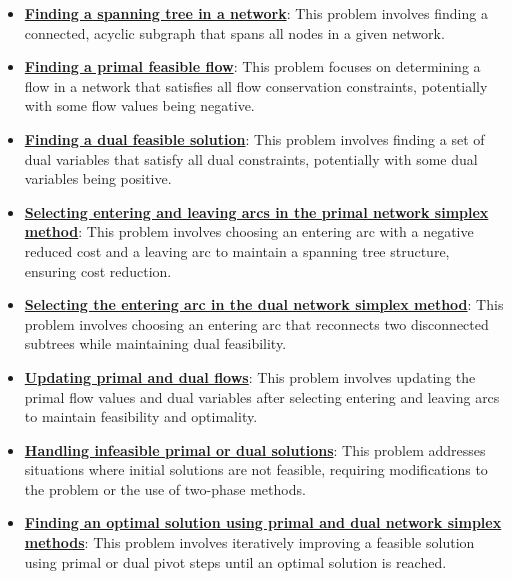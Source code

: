 \documentclass{article}%
\begin{document}
\begin{itemize}[leftmargin=*]%
\item \href{https://www.math.purdue.edu/~yipn/421//2024-11-07-NetSimplex.pdf#page=1}{\textbf{Finding a spanning tree in a network}}: This problem involves finding a connected, acyclic subgraph that spans all nodes in a given network.%
\item \href{https://www.math.purdue.edu/~yipn/421//2024-11-07-NetSimplex.pdf#page=2}{\textbf{Finding a primal feasible flow}}: This problem focuses on determining a flow in a network that satisfies all flow conservation constraints, potentially with some flow values being negative.%
\item \href{https://www.math.purdue.edu/~yipn/421//2024-11-07-NetSimplex.pdf#page=3}{\textbf{Finding a dual feasible solution}}: This problem involves finding a set of dual variables that satisfy all dual constraints, potentially with some dual variables being positive.%
\item \href{https://www.math.purdue.edu/~yipn/421//2024-11-07-NetSimplex.pdf#page=6}{\textbf{Selecting entering and leaving arcs in the primal network simplex method}}: This problem involves choosing an entering arc with a negative reduced cost and a leaving arc to maintain a spanning tree structure, ensuring cost reduction.%
\item \href{https://www.math.purdue.edu/~yipn/421//2024-11-07-NetSimplex.pdf#page=35}{\textbf{Selecting the entering arc in the dual network simplex method}}: This problem involves choosing an entering arc that reconnects two disconnected subtrees while maintaining dual feasibility.%
\item \href{https://www.math.purdue.edu/~yipn/421//2024-11-07-NetSimplex.pdf#page=6}{\textbf{Updating primal and dual flows}}: This problem involves updating the primal flow values and dual variables after selecting entering and leaving arcs to maintain feasibility and optimality.%
\item \href{https://www.math.purdue.edu/~yipn/421//2024-11-07-NetSimplex.pdf#page=2}{\textbf{Handling infeasible primal or dual solutions}}: This problem addresses situations where initial solutions are not feasible, requiring modifications to the problem or the use of two-phase methods.%
\item \href{https://www.math.purdue.edu/~yipn/421//2024-11-07-NetSimplex.pdf#page=5}{\textbf{Finding an optimal solution using primal and dual network simplex methods}}: This problem involves iteratively improving a feasible solution using primal or dual pivot steps until an optimal solution is reached.%

\end{itemize}
\end{document}
